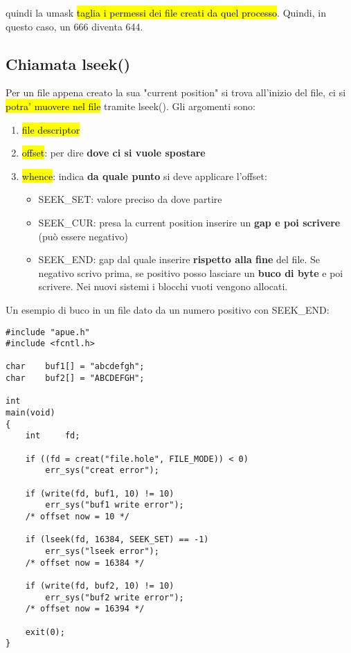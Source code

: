 quindi la umask \hl{taglia i permessi dei file creati da quel processo}. Quindi, in questo caso, un 666 diventa 644.


\subsection{Chiamata lseek()}

Per un file appena creato la sua "current position" si trova all'inizio del file, ci si \hl{potra' muovere nel file} tramite lseek(). Gli argomenti sono:

\begin{enumerate}
	\item \hl{file descriptor}
	
	\item \hl{offset}: per dire \textbf{dove ci si vuole spostare}
	
	\item \hl{whence}: indica \textbf{da quale punto} si deve applicare l'offset:
	
		\begin{itemize}
			\item SEEK\_SET: valore preciso da dove partire
			
			\item SEEK\_CUR: presa la current position inserire un \textbf{gap e poi scrivere} (può essere negativo)
			
			\item SEEK\_END: gap dal quale inserire \textbf{rispetto alla fine} del file. Se negativo scrivo prima, se positivo posso lasciare un \textbf{buco di byte} e poi scrivere. Nei nuovi sistemi i blocchi vuoti vengono allocati.
		\end{itemize}
	
	
\end{enumerate}

Un esempio di buco in un file dato da un numero positivo con SEEK\_END:

\begin{lstlisting}
#include "apue.h"
#include <fcntl.h>

char	buf1[] = "abcdefgh";
char	buf2[] = "ABCDEFGH";

int
main(void)
{
	int		fd;

	if ((fd = creat("file.hole", FILE_MODE)) < 0)
		err_sys("creat error");

	if (write(fd, buf1, 10) != 10)
		err_sys("buf1 write error");
	/* offset now = 10 */

	if (lseek(fd, 16384, SEEK_SET) == -1)
		err_sys("lseek error");
	/* offset now = 16384 */

	if (write(fd, buf2, 10) != 10)
		err_sys("buf2 write error");
	/* offset now = 16394 */

	exit(0);
}	
\end{lstlisting}

